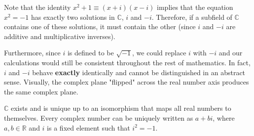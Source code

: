     Note that the identity $x^2 + 1 \equiv (x + i) (x - i)$ implies that the equation $x^2 = -1$ has exactly two solutions in $\mathbb{C}$, $i$ and $-i$. Therefore, if a subfield of $\mathbb{C}$ contains one of these solutions, it must contain the other (since $i$ and $-i$ are additive and multiplicative inverses). 

    Furthermore, since $i$ is defined to be $\sqrt{-1}$, we could replace $i$ with $-i$ and our calculations would still be consistent throughout the rest of mathematics. In fact, $i$ and $-i$ behave \textbf{exactly} identically and cannot be distinguished in an abstract sense. Visually, the complex plane "flipped" across the real number axis produces the same complex plane. 

    \begin{theorem}
      $\mathbb{C}$ exists and is unique up to an isomorphism that maps all real numbers to themselves. Every complex number can be uniquely written as $a + bi$, where $a, b \in \mathbb{R}$ and $i$ is a fixed element such that $i^2 = -1$. 
    \end{theorem}
